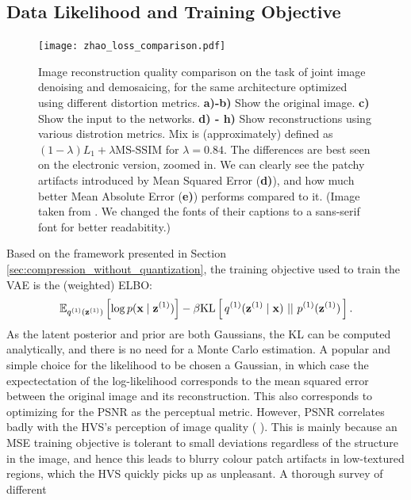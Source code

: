 \subsection{Data Likelihood and Training Objective}
\begin{figure}
  \centering
  \texttt{[image: zhao\_loss\_comparison.pdf]}
  \caption[Loss comparison for neural image reconstruction.]
  {Image reconstruction quality comparison on the task of joint
    image denoising and demosaicing, for the same architecture optimized using
    different distortion metrics. \textbf{a)-b)} Show the original image.
    \textbf{c)} Show the input to the networks. \textbf{d) - h)} Show
    reconstructions using various distrotion metrics. Mix is (approximately)
    defined as $(1 - \lambda) L_1 + \lambda \text{MS-SSIM}$ for $\lambda = 0.84$.
    The differences are best
    seen on the electronic version, zoomed in. We can clearly see the patchy
    artifacts introduced by Mean Squared Error (\textbf{d)}), and how much
    better Mean Absolute Error (\textbf{e)}) performs compared to it.
    (Image taken from \cite{zhao2015loss}. We changed the fonts of their
    captions to a sans-serif font for better readabitity.)}
  \label{fig:zhao_loss_comparison}
\end{figure}
\par
Based on the framework presented in Section
\ref{sec:compression_without_quantization}, the training objective used to train
the VAE is the (weighted) ELBO:
\begin{equation}
\label{eq:regular_vae_elbo}
\Exp{\log p(\vec{x} \mid \vec{z}^{(1)})}{q^{(1)}(\vec{z}^{(1)})}
- \beta \KL{q^{(1)}(\vec{z}^{(1)} \mid \vec{x})}{p^{(1)}(\vec{z}^{(1)})}.
\end{equation}
As the latent posterior and prior are both Gaussians, the KL can be computed
analytically, and there is no need for a Monte Carlo estimation. A popular and
simple choice for the likelihood to be chosen a Gaussian, in which case the
expectectation of the log-likelihood corresponds to the mean squared error
between the original image and its reconstruction. This also corresponds to
optimizing for the PSNR as the perceptual metric. However, PSNR correlates badly
with the HVS's perception of image quality (\cite{girod1993s}
\cite{eskicioglu1994image}). This is mainly because an MSE training objective is
tolerant to small deviations regardless of the structure in the image, and hence
this leads to blurry colour patch artifacts in low-textured regions, which the
HVS quickly picks up as unpleasant. A thorough survey of different

